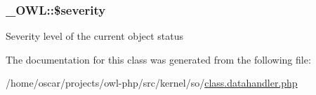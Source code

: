 \subsubsection[{\$severity}]{\setlength{\rightskip}{0pt plus 5cm}\_\-OWL::\$severity}\label{class__OWL_ad26b40a9dbbacb33e299b17826f8327c}
Severity level of the current object status 

The documentation for this class was generated from the following file:\begin{DoxyCompactItemize}
\item 
/home/oscar/projects/owl-\/php/src/kernel/so/\hyperlink{class_8datahandler_8php}{class.datahandler.php}\end{DoxyCompactItemize}
